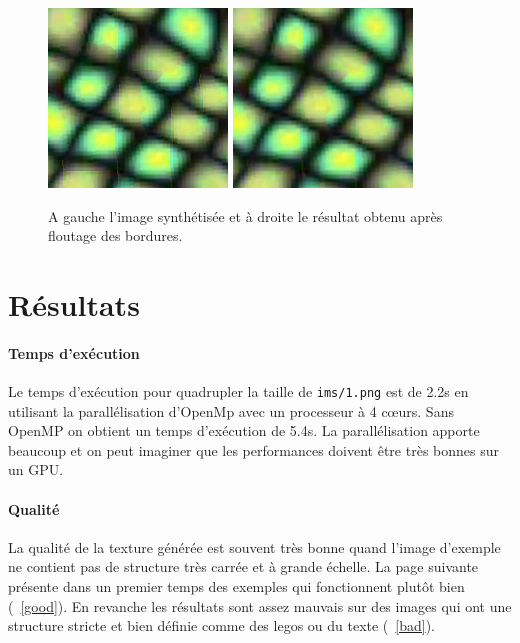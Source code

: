 \documentclass[12pt]{article}
\begin{document}
\begin{figure}
	\centering
	\includegraphics[scale=3]{bordure.png}
	\quad
	\includegraphics[scale=3]{flou.png}
	\captionsetup{justification=centering}
	\caption{A gauche l'image synthétisée et à droite le résultat obtenu après floutage des bordures.}
	\label{petit}
\end{figure}

\section{Résultats}

\paragraph{Temps d'exécution}
Le temps d'exécution pour quadrupler la taille de \verb|ims/1.png| est de 2.2s en utilisant la parallélisation d'OpenMp avec un processeur à 4 cœurs. Sans OpenMP on obtient un temps d'exécution de 5.4s. La parallélisation apporte beaucoup et on peut imaginer que les performances doivent être très bonnes sur un GPU.

\paragraph{Qualité}
La qualité de la texture générée est souvent très bonne quand l'image d'exemple ne contient pas de structure très carrée et à grande échelle. La page suivante présente dans un premier temps des exemples qui fonctionnent plutôt bien (\figurename~\ref{good}). En revanche les résultats sont assez mauvais sur des images qui ont une structure stricte et bien définie comme des legos ou du texte (\figurename~\ref{bad}).
\end{document}
